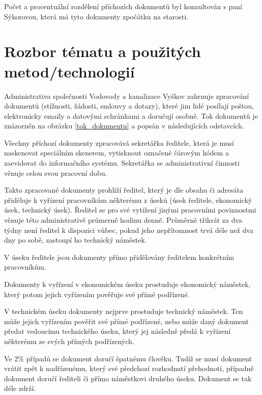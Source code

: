 \documentclass[12pt,a4paper]{article}
\begin{document}
Počet a procentuální rozdělení příchozích dokumentů byl konzultován s paní Sýkorovou, která má tyto dokumenty zpočátku na starosti.


\newpage


\section{Rozbor tématu a použitých metod/technologií}

Administrativa společnosti Vodovody a kanalizace Vyškov zahrnuje zpracování dokumentů (stížnosti, žádosti, smlouvy a dotazy), které jim lidé posílají poštou, elektronicky emaily a datovými schránkami a doručují osobně. Tok dokumentů je znázorněn na obrázku \ref{tok_dokumentu} a popsán v následujících odstavcích.

Všechny příchozí dokumenty zpracovává sekretářka ředitele, která je musí naskenovat speciálním skenerem, vytisknout označené čárovým kódem a zaevidovat do informačního systému. Sekretářka se administrativní činnosti věnuje celou svou pracovní dobu.

Takto zpracované dokumenty prohlíží ředitel, který je dle obsahu či adresáta při\-dě\-lu\-je k vyřízení pracovníkům některému z úseků (úsek ředitele, ekonomický úsek, technický úsek). Ředitel se pro své vytížení jinými pracovními povinnostmi věnuje této administrativě průmerně hodinu denně.
Průměrně třikrát za dva týdny není ředitel k dispozici vůbec, pokud jeho nepřítomnost trvá déle než dva dny po sobě, zastoupí ho technický náměstek.

V úseku ředitele jsou dokumenty přímo přidělovány ředitelem konkrétním pra\-cov\-ní\-kům.

Dokumenty k vyřízení v ekonomickém úseku prostuduje ekonomický náměstek, který potom jejich vyřízením pověřuje své přímé podřízené.

V technickém úseku dokumenty nejprve prostuduje technický náměstek. Ten může jejich vyřízením pověřit své přímé podřízené, nebo může daný dokument předat vedoucímu technického úseku, který jej následně předá k vyřízení některému ze svých přímých podřízených.

Ve 2\% případů se dokument doručí špatnému člověku. Tudíž se musí dokument vrátit zpět k nadřízenému, který své předchozí rozhodnutí přehodnotí, případně dokument doručí řediteli či přímo náměstkovi druhého úseku. Dokument se tak déle zdrží.
\end{document}
